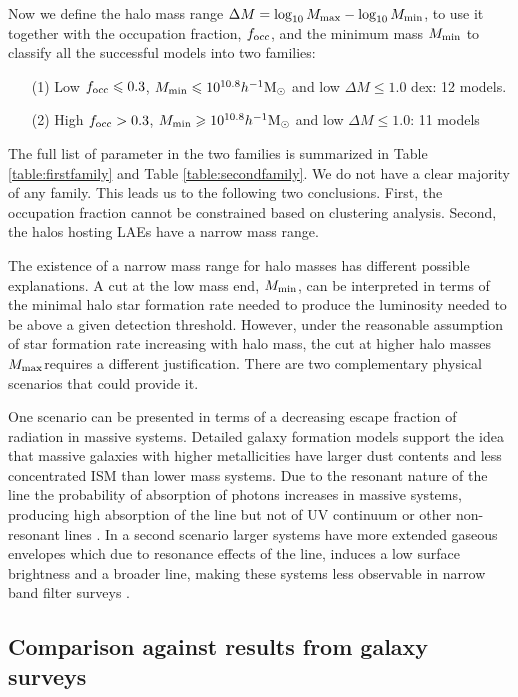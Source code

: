 \documentclass[usenatbib]{mn2e}
\newcommand{\ly}{{\ifmmode{{\rm Ly}\alpha}\else{Ly$\alpha$~}\fi}}
\newcommand{\hMsun}{{\ifmmode{h^{-1}{\rm
        {M_{\odot}}}}\else{$h^{-1}{\rm{M_{\odot}}}$}\fi}}
\begin{document}
{Now we define the halo mass range $\Delta M=\log_{10}M_{\rm max} -
\log_{10}M_{\rm  min}$, to use it together with the occupation
fraction, $f_{\rm occ}$, and the minimum mass $M_{\rm min}$ to
classify all the successful models into two families:   


\begin{itemize}
\item[(1)] Low $f_{\rm occ}\leq 0.3$, $M_{\rm min}\leq 10^{10.8}\hMsun$ and low $\Delta M\leq 1.0$
  dex: 12 models. 
\item[(2)] High $f_{\rm occ}> 0.3$, $M_{\rm min}\geq 10^{10.8}\hMsun$ and
  low $\Delta M\leq 1.0$: 11 models 
\end{itemize}
%
The full list of parameter in the two families is summarized in Table
\ref{table:firstfamily} and Table \ref{table:secondfamily}. We do not
have a clear majority of any family. This leads us to the following
two conclusions. First, the occupation fraction cannot be constrained
based on clustering analysis. Second, the halos hosting LAEs have a
narrow mass range.  

The existence of a narrow mass range for halo masses has different
possible explanations. A cut at the low mass end, $M_{\rm min}$, can be
interpreted in terms of the minimal halo star formation rate needed to
produce the \ly luminosity needed to be above a given detection
threshold.  However, under the reasonable assumption of star formation
rate increasing with halo mass, the cut at higher halo masses $M_{\rm
  max}$requires a different justification. There are two complementary physical
scenarios that could provide it.

One scenario can be presented in terms of a decreasing escape fraction
of \ly radiation in massive systems. Detailed galaxy formation models
support the idea that massive galaxies with higher metallicities have
larger dust contents and less concentrated ISM than lower mass
systems. Due to the resonant nature of the \ly line the probability of
absorption  of \ly photons increases in massive systems, producing
high absorption of the \ly line but not of UV continuum or other
non-resonant lines \citep{Laursen2009,ForeroRomero2011}. In a second
scenario larger systems have more extended gaseous envelopes which due
to resonance effects of the \ly line, induces a low surface brightness
and a broader line, making these systems less observable in narrow
band filter surveys \citep{Laursen2009,Zheng2010}.    


\subsection{Comparison against results from galaxy surveys}

}
\end{document}
